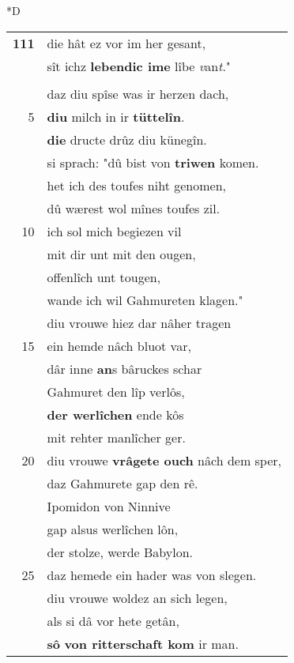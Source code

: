 \documentclass[8pt,a4paper,notitlepage]{article}
\begin{document}
\begin{table}[ht]
\begin{minipage}[t]{0.5\linewidth}
\small
\begin{center}*D
\end{center}
\begin{tabular}{rl}
\textbf{111} & die hât ez vor im her gesant,\\ 
 & sît ichz \textbf{lebendic ime} lîbe \textit{v}an\textit{t}."\\ 
 & \textit{\begin{large}D\end{large}}iu vrouwe ir willen dâr an sach,\\ 
 & daz diu spîse was ir herzen dach,\\ 
5 & \textbf{diu} milch in ir \textbf{tüttelîn}.\\ 
 & \textbf{die} dructe drûz diu künegîn.\\ 
 & si sprach: "dû bist von \textbf{triwen} komen.\\ 
 & het ich des toufes niht genomen,\\ 
 & dû wærest wol mînes toufes zil.\\ 
10 & ich sol mich begiezen vil\\ 
 & mit dir unt mit den ougen,\\ 
 & offenlîch unt tougen,\\ 
 & wande ich wil Gahmureten klagen."\\ 
 & diu vrouwe hiez dar nâher tragen\\ 
15 & ein hemde nâch bluot var,\\ 
 & dâr inne \textbf{an}s bâruckes schar\\ 
 & Gahmuret den lîp verlôs,\\ 
 & \textbf{der werlîchen} ende kôs\\ 
 & mit rehter manlîcher ger.\\ 
20 & diu vrouwe \textbf{vrâgete ouch} nâch dem sper,\\ 
 & daz Gahmurete gap den rê.\\ 
 & Ipomidon von Ninnive\\ 
 & gap alsus werlîchen lôn,\\ 
 & der stolze, werde Babylon.\\ 
25 & daz hemede ein hader was von slegen.\\ 
 & diu vrouwe woldez an sich legen,\\ 
 & als si dâ vor hete getân,\\ 
 & \textbf{sô} \textbf{von ritterschaft kom} ir man.\\ 

\end{tabular}
\end{minipage}
\end{table}
\end{document}

